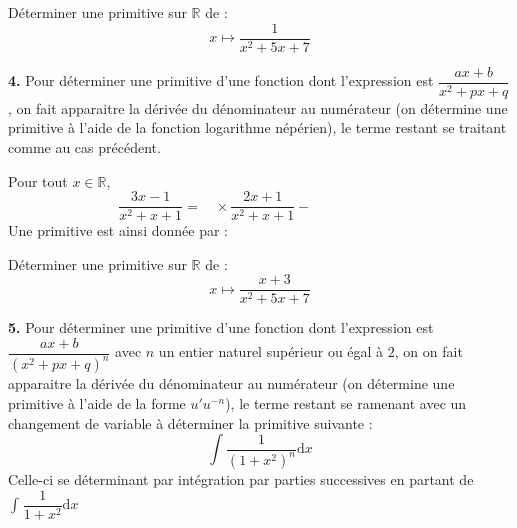 \documentclass[french,11pt,twoside]{VcCours}
\newcommand{\dx}{\text{d}x}
\newcommand{\Int}[2]{\int_{#1}^{#2}}
\begin{document}
\begin{ApplicationDirecte}{} Déterminer une primitive sur $\mathbb{R}$ de :
$$ x \mapsto \frac{1}{x^2+5x+7}$$
\end{ApplicationDirecte}


\textbf{4.} Pour déterminer une primitive d'une fonction dont l'expression est $\dfrac{ax+b}{x^2+px+q}$, on fait apparaitre la dérivée du dénominateur au numérateur (on détermine une primitive à l'aide de la fonction logarithme népérien), le terme restant se traitant comme au cas précédent.

\begin{Exemple} Pour tout $x \in \mathbb{R}$,
$$ \frac{3x-1}{x^2+x+1} = \; \phantom{\frac{3}{2}} \times \frac{2x+1}{x^2+x+1} - \phantom{\frac{5}{2} \times \frac{1}{x^2+x+1}}$$
Une primitive est ainsi donnée par :

\vspace{3cm}
\end{Exemple}

\begin{ApplicationDirecte}{} Déterminer une primitive sur $\mathbb{R}$ de :
$$ x \mapsto \frac{x+3}{x^2+5x+7}$$
\end{ApplicationDirecte}

\textbf{5.} Pour déterminer une primitive d'une fonction dont l'expression est $\dfrac{ax+b}{(x^2+px+q)^n}$ avec $n$ un entier naturel supérieur ou égal à $2$, on on fait apparaitre la dérivée du dénominateur au numérateur (on détermine une primitive à l'aide de la forme $u'u^{-n}$), le terme restant se ramenant avec un changement de variable à déterminer la primitive suivante :
$$ \int \frac{1}{(1+x^2)^n} \dx$$
Celle-ci se déterminant par intégration par parties successives en partant de $\Int{}{} \dfrac{1}{1+x^2} \dx$
\end{document}
